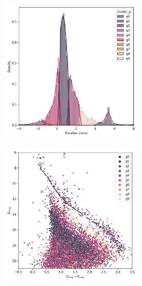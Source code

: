 \documentclass[11pt, a4paper, english]{book}
\begin{document}
\begin{figure}[H]
\begin{subfigure}{0.9\textwidth}
\begin{subfigure}[t]{0.30\textwidth}
    \end{subfigure}
    \hfill
    \begin{subfigure}[t]{0.30\textwidth}
      \centering
      \includegraphics[width=\textwidth]{../figures/ngc_2632/kmeans_parallax_ngc_2632.png}
    \end{subfigure}
    \hfill
    \begin{subfigure}[t]{0.30\textwidth}
      \centering
      \includegraphics[width=\textwidth]{../figures/ngc_2632/kmeans_hr_diagram_ngc_2632.png}

\end{subfigure}
\end{subfigure}
\end{figure}
\end{document}

